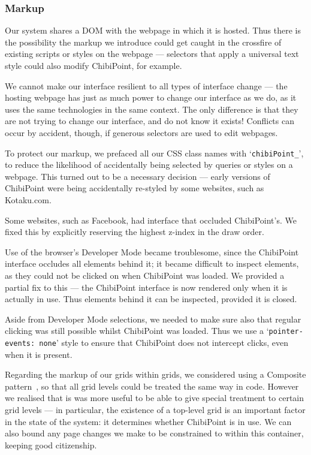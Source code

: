 \documentclass[11pt,openright,a4paper]{report}
\begin{document}
\subsubsection{Markup}
Our system shares a DOM with the webpage in which it is hosted. Thus there is the possibility the markup we introduce could get caught in the crossfire of existing scripts or styles on the webpage --- selectors that apply a universal text style could also modify ChibiPoint, for example.

We cannot make our interface resilient to all types of interface change --- the hosting webpage has just as much power to change our interface as we do, as it uses the same technologies in the same context. The only difference is that they are not trying to change our interface, and do not know it exists! Conflicts can occur by accident, though, if generous selectors are used to edit webpages.

To protect our markup, we prefaced all our CSS class names with `\texttt{chibiPoint\_}', to reduce the likelihood of accidentally being selected by queries or styles on a webpage. This turned out to be a necessary decision --- early versions of ChibiPoint were being accidentally re-styled by some websites, such as Kotaku.com.

Some websites, such as Facebook, had interface that occluded ChibiPoint's. We fixed this by explicitly reserving the highest z-index in the draw order.

Use of the browser's Developer Mode became troublesome, since the ChibiPoint interface occludes all elements behind it; it became difficult to inspect elements, as they could not be clicked on when ChibiPoint was loaded. We provided a partial fix to this --- the ChibiPoint interface is now rendered only when it is actually in use. Thus elements behind it can be inspected, provided it is closed.

Aside from Developer Mode selections, we needed to make sure also that regular clicking was still possible whilst ChibiPoint was loaded. Thus we use a `\texttt{pointer-events: none}' style to ensure that ChibiPoint does not intercept clicks, even when it is present.

Regarding the markup of our grids within grids, we considered using a Composite pattern~\cite{gamma1994design}, so that all grid levels could be treated the same way in code. However we realised that is was more useful to be able to give special treatment to certain grid levels --- in particular, the existence of a top-level grid is an important factor in the state of the system: it determines whether ChibiPoint is in use. We can also bound any page changes we make to be constrained to within this container, keeping good citizenship.
\end{document}
